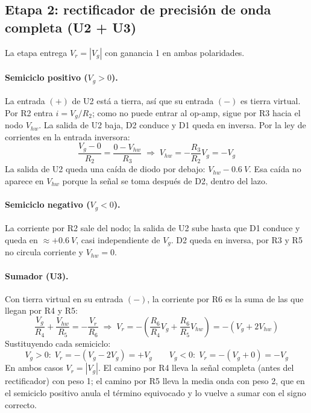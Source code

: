 \documentclass[11pt,letterpaper]{article}
\newcommand{\Vg}{V_g}
\newcommand{\Vr}{V_r}
\begin{document}
\subsection{Etapa 2: rectificador de precisión de onda completa (U2 + U3)}

La etapa entrega $\Vr=|\Vg|$ con ganancia 1 en ambas polaridades.

\paragraph{Semiciclo positivo ($\Vg>0$).} La entrada $(+)$ de U2 está a tierra, así que su entrada $(-)$ es tierra virtual. Por R2 entra $i=\Vg/R_2$; como no puede entrar al op-amp, sigue por R3 hacia el nodo $V_{hw}$. La salida de U2 baja, D2 conduce y D1 queda en inversa. Por la ley de corrientes en la entrada inversora:
\begin{equation}
\frac{\Vg-0}{R_2}=\frac{0-V_{hw}}{R_3}\;\Rightarrow\; V_{hw}=-\frac{R_3}{R_2}\Vg=-\Vg
\end{equation}
La salida de U2 queda una caída de diodo por debajo: $V_{hw}-\SI{0,6}{V}$. Esa caída no aparece en $V_{hw}$ porque la señal se toma después de D2, dentro del lazo.

\paragraph{Semiciclo negativo ($\Vg<0$).} La corriente por R2 sale del nodo; la salida de U2 sube hasta que D1 conduce y queda en $\approx+\SI{0,6}{V}$, casi independiente de $\Vg$. D2 queda en inversa, por R3 y R5 no circula corriente y $V_{hw}=0$.

\paragraph{Sumador (U3).} Con tierra virtual en su entrada $(-)$, la corriente por R6 es la suma de las que llegan por R4 y R5:
\begin{equation}
\frac{\Vg}{R_4}+\frac{V_{hw}}{R_5}=-\frac{\Vr}{R_6}\;\Rightarrow\;\Vr=-\left(\frac{R_6}{R_4}\Vg+\frac{R_6}{R_5}V_{hw}\right)=-\left(\Vg+2V_{hw}\right)
\label{eq:sumador}
\end{equation}
Sustituyendo cada semiciclo:
\begin{equation}
\Vg>0:\;\Vr=-(\Vg-2\Vg)=+\Vg \qquad \Vg<0:\;\Vr=-(\Vg+0)=-\Vg
\end{equation}
En ambos casos $\Vr=|\Vg|$. El camino por R4 lleva la señal completa (antes del rectificador) con peso 1; el camino por R5 lleva la media onda con peso 2, que en el semiciclo positivo anula el término equivocado y lo vuelve a sumar con el signo correcto.
\end{document}
